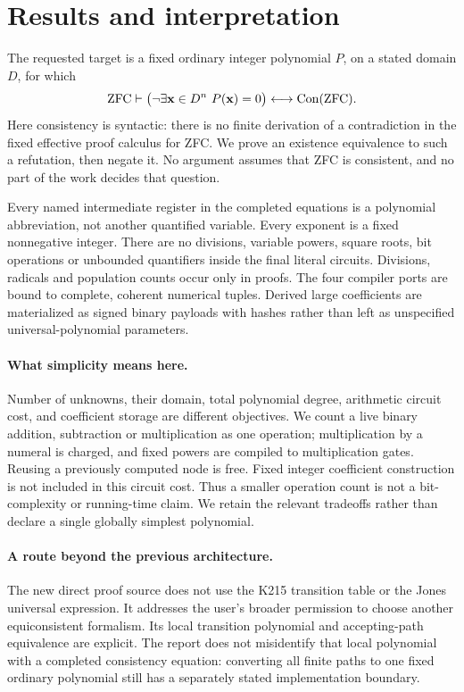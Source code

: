 \section{Results and interpretation}
The requested target is a fixed ordinary integer polynomial $P$, on a stated domain $D$, for which
\[
 \mathrm{ZFC}\vdash \bigl(\neg\exists\mathbf x\in D^n\ P(\mathbf x)=0\bigr)
 \longleftrightarrow\operatorname{Con}(\mathrm{ZFC}).
\]
Here consistency is syntactic: there is no finite derivation of a contradiction in the fixed effective proof calculus for ZFC. We prove an existence equivalence to such a refutation, then negate it. No argument assumes that ZFC is consistent, and no part of the work decides that question.



Every named intermediate register in the completed equations is a polynomial abbreviation, not another quantified variable. Every exponent is a fixed nonnegative integer. There are no divisions, variable powers, square roots, bit operations or unbounded quantifiers inside the final literal circuits. Divisions, radicals and population counts occur only in proofs. The four compiler ports are bound to complete, coherent numerical tuples. Derived large coefficients are materialized as signed binary payloads with hashes rather than left as unspecified universal-polynomial parameters.

\paragraph{What simplicity means here.}
Number of unknowns, their domain, total polynomial degree, arithmetic circuit cost, and coefficient storage are different objectives. We count a live binary addition, subtraction or multiplication as one operation; multiplication by a numeral is charged, and fixed powers are compiled to multiplication gates. Reusing a previously computed node is free. Fixed integer coefficient construction is not included in this circuit cost. Thus a smaller operation count is not a bit-complexity or running-time claim. We retain the relevant tradeoffs rather than declare a single globally simplest polynomial.

\paragraph{A route beyond the previous architecture.}
The new direct proof source does not use the K215 transition table or the Jones universal expression. It addresses the user's broader permission to choose another equiconsistent formalism. Its local transition polynomial and accepting-path equivalence are explicit. The report does not misidentify that local polynomial with a completed consistency equation: converting all finite paths to one fixed ordinary polynomial still has a separately stated implementation boundary.
